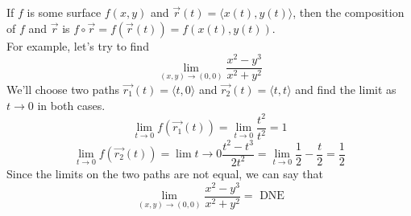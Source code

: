 \noindent
If $f$ is some surface $f(x, y)$ and $\vec{r}(t) = \langle x(t), y(t)\rangle$, then the composition of $f$ and $\vec{r}$ is $f\circ\vec{r} = f(\vec{r}(t)) = f(x(t), y(t))$.\\
For example, let's try to find
\begin{equation*}
	\lim_{(x,y) \to (0,0)}{\frac{x^2-y^3}{x^2+y^2}}
\end{equation*}
\indent
We'll choose two paths $\vec{r_1}(t) = \langle t, 0 \rangle$ and $\vec{r_2}(t) = \langle t, t \rangle$ and find the limit as $t \to 0$ in both cases.\\
\indent
\begin{equation*}
	\lim_{t \to 0}{f(\vec{r_1}(t))} = \lim_{t \to 0}{\frac{t^2}{t^2}} = 1
\end{equation*}
\indent
\begin{equation*}
	\lim_{t \to 0}{f(\vec{r_2}(t))} = \lim{t \to 0}{\frac{t^2-t^3}{2t^2}} = \lim_{t \to 0}{\frac{1}{2} - \frac{t}{2}} = \frac{1}{2}
\end{equation*}
\indent
Since the limits on the two paths are not equal, we can say that
\begin{equation*}
	\lim_{(x,y) \to (0,0)}{\frac{x^2-y^3}{x^2+y^2}} = \text{ DNE}
\end{equation*}